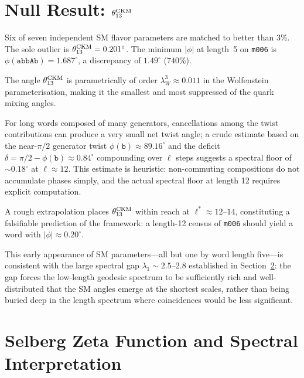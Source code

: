 \documentclass[11pt,a4paper]{article}
\newcommand{\mfld}[1]{\texttt{#1}}
\newcommand{\word}[1]{\texttt{#1}}
\newcommand{\degr}{^{\circ}}
\begin{document}
\section{Null Result: \texorpdfstring{\texorpdfstring{$\theta_{13}^{\rm CKM}$}{theta13 CKM}}{theta13(CKM)}}
\label{sec:null}

Six of seven independent SM flavor parameters are matched to better than $3\%$.
The sole outlier is $\theta_{13}^{\rm CKM}=0.201\degr$.
The minimum $|\phi|$ at length~5 on \mfld{m006} is
$\phi(\word{abbAb})=1.687\degr$, a discrepancy of $1.49\degr$ ($740\%$).

The angle $\theta_{13}^{\rm CKM}$ is parametrically of order
$\lambda_W^3\approx 0.011$ in the Wolfenstein parameterisation,
making it the smallest and most suppressed of the quark mixing angles.

For long words composed of many generators, cancellations among the
twist contributions can produce a very small net twist angle; a
crude estimate based on the near-$\pi/2$ generator twist
$\phi(\word{b})\approx 89.16\degr$ and the deficit
$\delta=\pi/2-\phi(\word{b})\approx 0.84\degr$ compounding over
$\ell$ steps suggests a spectral floor of ${\sim}0.18\degr$ at
$\ell\approx 12$.
This estimate is heuristic: non-commuting compositions do not accumulate
phases simply, and the actual spectral floor at length 12 requires
explicit computation.

A rough extrapolation places $\theta_{13}^{\rm CKM}$ within reach at
$\ell^*\approx 12$--$14$, constituting a falsifiable prediction of the
framework: a length-12 census of \mfld{m006} should yield a word with
$|\phi|\approx 0.20\degr$.

This early appearance of SM parameters---all but one by word length
five---is consistent with the large spectral gap $\lambda_1\sim 2.5$--$2.8$
established in Section~\ref{sec:selberg}: the gap forces the low-length
geodesic spectrum to be sufficiently rich and well-distributed that the SM
angles emerge at the shortest scales, rather than being buried deep in the
length spectrum where coincidences would be less significant.

\section{Selberg Zeta Function and Spectral Interpretation}
\label{sec:selberg}
\end{document}
